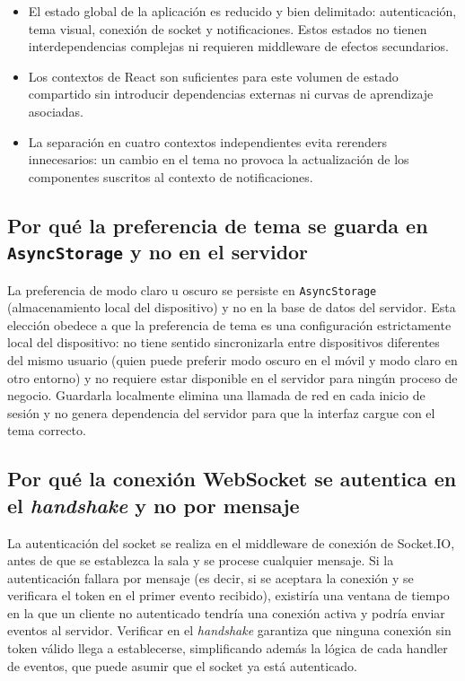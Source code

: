 \begin{itemize}
    \item El estado global de la aplicación es reducido y bien delimitado: autenticación, tema visual, conexión de socket y notificaciones. Estos estados no tienen interdependencias complejas ni requieren middleware de efectos secundarios.
    \item Los contextos de React son suficientes para este volumen de estado compartido sin introducir dependencias externas ni curvas de aprendizaje asociadas.
    \item La separación en cuatro contextos independientes evita rerenders innecesarios: un cambio en el tema no provoca la actualización de los componentes suscritos al contexto de notificaciones.
\end{itemize}

\subsection{Por qué la preferencia de tema se guarda en \texttt{AsyncStorage} y no en el servidor}

La preferencia de modo claro u oscuro se persiste en \texttt{AsyncStorage} (almacenamiento local del dispositivo) y no en la base de datos del servidor. Esta elección obedece a que la preferencia de tema es una configuración estrictamente local del dispositivo: no tiene sentido sincronizarla entre dispositivos diferentes del mismo usuario (quien puede preferir modo oscuro en el móvil y modo claro en otro entorno) y no requiere estar disponible en el servidor para ningún proceso de negocio. Guardarla localmente elimina una llamada de red en cada inicio de sesión y no genera dependencia del servidor para que la interfaz cargue con el tema correcto.

\subsection{Por qué la conexión WebSocket se autentica en el \textit{handshake} y no por mensaje}

La autenticación del socket se realiza en el middleware de conexión de Socket.IO, antes de que se establezca la sala y se procese cualquier mensaje. Si la autenticación fallara por mensaje (es decir, si se aceptara la conexión y se verificara el token en el primer evento recibido), existiría una ventana de tiempo en la que un cliente no autenticado tendría una conexión activa y podría enviar eventos al servidor. Verificar en el \textit{handshake} garantiza que ninguna conexión sin token válido llega a establecerse, simplificando además la lógica de cada handler de eventos, que puede asumir que el socket ya está autenticado.

